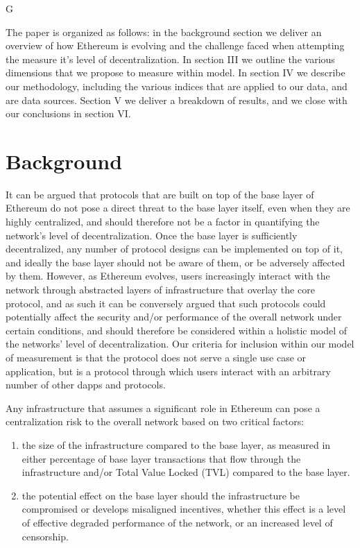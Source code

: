 G\documentclass[conference]{IEEEtran}
\begin{document}
The paper is organized as follows: in the background section we deliver an overview of how Ethereum is evolving and the challenge faced when attempting the measure it's level of decentralization.  In section III we outline the various dimensions that we propose to measure within model.  In section IV we describe our methodology, including the various indices that are applied to our data, and are data sources.  Section V we deliver a breakdown of results, and we close with our conclusions in section VI.

\section{Background}

It can be argued that protocols that are built on top of the base layer of Ethereum do not pose a direct threat to the base layer itself, even when they are highly centralized, and should therefore not be a factor in quantifying the network's level of decentralization.  Once the base layer is sufficiently decentralized, any number of protocol designs can be implemented on top of it, and ideally the base layer should not be aware of them, or be adversely affected by them.  However, as Ethereum evolves, users increasingly interact with the network through abstracted layers of infrastructure that overlay the core protocol, and as such it can be conversely argued that such protocols could potentially affect the security and/or performance of the overall network under certain conditions, and should therefore be considered within a holistic model of the networks' level of decentralization.   Our criteria for inclusion within our model of measurement is that the protocol does not serve a single use case or application, but is a protocol through which users interact with an arbitrary number of other dapps and protocols.

Any infrastructure that assumes a significant role in Ethereum can pose a centralization risk to the overall network based on two critical factors:
\begin{enumerate}[label=\alph*.]
\item the size of the infrastructure compared to the base layer, as measured in either percentage of base layer transactions that flow through the infrastructure and/or Total Value Locked (TVL) compared to the base layer.
\item the potential effect on the base layer should the infrastructure be compromised or develops misaligned incentives, whether this effect is a level of effective degraded performance of the network, or an increased level of censorship.
\end{enumerate}
\end{document}
